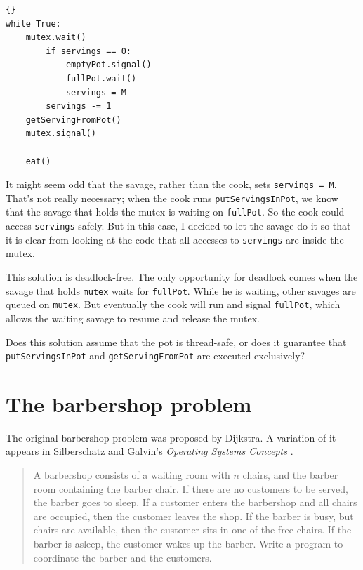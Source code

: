 \documentclass{book}
\newcommand{\clearemptydoublepage}{\newpage\cleardoublepage}
\begin{document}
\begin{latin}
\begin{latin}
\begin{lstlisting}[title={Dining Savages solution (savage)}]{}
while True:
    mutex.wait()
        if servings == 0:
            emptyPot.signal()
            fullPot.wait()
            servings = M
        servings -= 1
	getServingFromPot()
    mutex.signal()

    eat()
\end{lstlisting}
\end{latin}
\end{latin}

It might seem odd that the savage, rather than the cook, sets
{\tt servings = M}.  That's not really necessary; when the cook
runs {\tt putServingsInPot}, we know that the savage that holds
the mutex is waiting on {\tt fullPot}.  So the cook could
access {\tt servings} safely.  But in this case, I decided to
let the savage do it so that it is clear from looking at the
code that all accesses to {\tt servings} are inside the mutex.

This solution is deadlock-free.  The only opportunity for
deadlock comes when the savage that holds {\tt mutex} waits
for {\tt fullPot}.  While he is waiting, other savages are
queued on {\tt mutex}.  But eventually the cook will run and
signal {\tt fullPot}, which allows the waiting savage
to resume and release the mutex.

Does this solution assume that the pot is thread-safe, or does it
guarantee that {\tt putServingsInPot} and {\tt getServingFromPot}
are executed exclusively?


\clearemptydoublepage
\section{The barbershop problem}

The original barbershop problem was proposed by
Dijkstra.  A variation of it appears in 
Silberschatz and Galvin's {\em Operating Systems Concepts}
\cite{silberschatz}.

\begin {quotation}
A barbershop consists of a waiting room with $n$ chairs, and the
barber room containing the barber chair.  If there are no customers to
be served, the barber goes to sleep.  If a customer enters the
barbershop and all chairs are occupied, then the customer leaves the
shop.  If the barber is busy, but chairs are available, then the
customer sits in one of the free chairs.  If the barber is asleep, the
customer wakes up the barber.  Write a program to coordinate the
barber and the customers.
\end{quotation}
\end{document}
